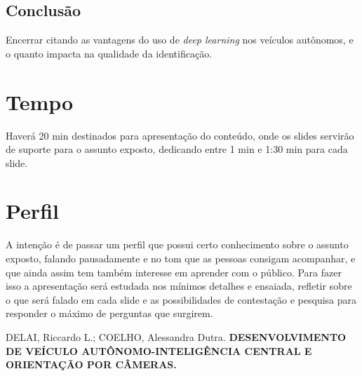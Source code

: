 \documentclass[12pt,a4paper]{article}
\begin{document}
    \subsection{Conclusão}
    \par Encerrar citando as vantagens do uso de \emph{deep learning} nos veículos autônomos, e o quanto impacta na qualidade da identificação.


    

    \section{Tempo}
    \par Haverá 20 min destinados para apresentação do conteúdo, onde os slides servirão de suporte para o assunto exposto, dedicando entre 1 min e 1:30 min para cada slide.  
    
    \section{Perfil}
    \par A intenção é de passar um perfil que possui certo conhecimento sobre o assunto exposto, falando pausadamente e no tom que as pessoas consigam acompanhar, e que ainda assim tem também interesse em aprender com o público. Para fazer isso a apresentação será estudada nos mínimos detalhes e ensaiada, refletir sobre o que será falado em cada slide e as possibilidades de contestação e pesquisa para responder o máximo de perguntas que surgirem.


     
    \begin{thebibliography}{BIBLIOGRAFIA}
 
         DELAI, Riccardo L.; COELHO, Alessandra Dutra. \textbf{DESENVOLVIMENTO DE VEÍCULO AUTÔNOMO-INTELIGÊNCIA CENTRAL E ORIENTAÇÃO POR CÂMERAS.}
    
    \end{thebibliography}




\end{document}
